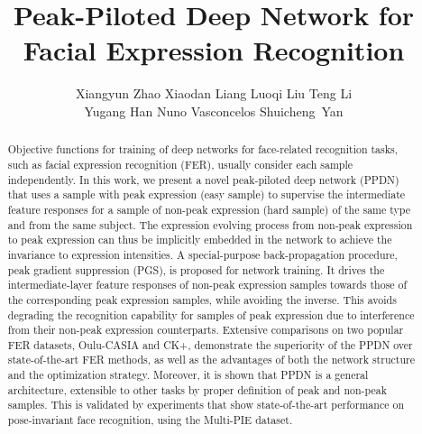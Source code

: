 \documentclass[runningheads]{llncs}
\begin{document}
\pagestyle{headings}
\mainmatter


\title{Peak-Piloted Deep Network for Facial Expression Recognition} 

\author{Xiangyun Zhao \quad Xiaodan Liang \quad Luoqi Liu \quad Teng Li\\ \quad Yugang Han \quad Nuno Vasconcelos \quad Shuicheng~Yan }



\maketitle

\begin{abstract}
	
Objective functions for training of deep networks for face-related 
recognition tasks, such as facial expression recognition (FER), usually 
consider each sample independently. In this work, we present a novel 
peak-piloted deep network (PPDN) that uses a sample with peak 
expression (easy sample) to supervise the intermediate feature responses
for a sample of non-peak expression (hard sample) of the same type and from 
the same subject. The expression
evolving process from non-peak expression to peak expression can thus be
implicitly embedded in the network to achieve the invariance to expression intensities. A special-purpose back-propagation procedure, peak gradient
suppression (PGS), is proposed for network training. It drives the 
intermediate-layer feature responses of non-peak expression samples
towards those of the corresponding peak expression samples, while
avoiding the inverse. This avoids degrading the recognition capability for 
samples of peak expression due to interference from their non-peak expression 
counterparts. Extensive comparisons on two popular FER datasets, Oulu-CASIA
and CK+, demonstrate the superiority of the PPDN over state-of-the-art 
FER methods, as well as the advantages of both the network structure and 
the optimization strategy. Moreover, it is shown that PPDN is
a general architecture, extensible to other tasks by proper definition of 
peak and non-peak samples. This is validated by experiments that
show state-of-the-art performance on pose-invariant face recognition,
using the Multi-PIE dataset.


\end{abstract}
\end{document}
